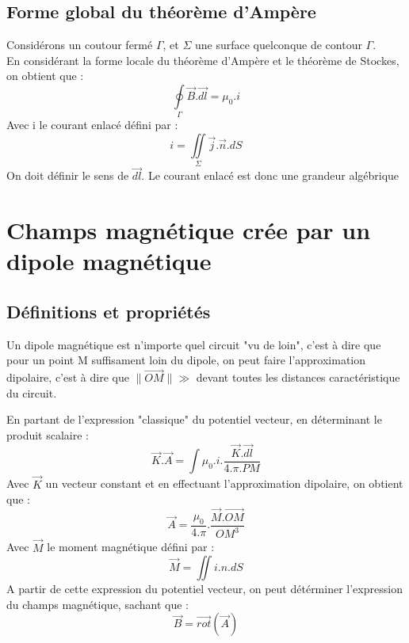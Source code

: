 \section{Forme global du théorème d'Ampère}
\begin{theo}
Considérons un coutour fermé $\Gamma$, et $\Sigma$ une surface quelconque de contour $\Gamma$.\\
En considérant la forme locale du théorème d'Ampère et le théorème de Stockes, on obtient que : 
$$\underset{\Gamma}\oint \overrightarrow{B}.\overrightarrow{dl}= \mu_0.i$$
Avec i le courant enlacé défini par : 
$$i = \underset{\Sigma}\iint \overrightarrow{j}.\overrightarrow{n}.dS$$
On doit définir le sens de $\overrightarrow{dl}$. Le courant enlacé est donc une grandeur algébrique
\end{theo}
\chapter{Champs magnétique crée par un dipole magnétique}
\section{Définitions et propriétés}
\begin{de}
Un dipole magnétique est n'importe quel circuit "vu de loin", c'est à dire que pour un point M suffisament loin du dipole, on peut faire l'approximation dipolaire, c'est à dire que $\parallel\overrightarrow{OM}\parallel \gg$ devant toutes les distances caractéristique du circuit.
\end{de}
\begin{prop}
En partant de l'expression "classique" du potentiel vecteur, en déterminant le produit scalaire :
$$\overrightarrow{K}.\overrightarrow{A} = \int \mu_0.i.\dfrac{\overrightarrow{K}.\overrightarrow{dl}}{4.\pi.PM}$$
Avec $\overrightarrow{K}$ un vecteur constant et en effectuant l'approximation dipolaire, on obtient que : 
$$\overrightarrow{A} = \dfrac{\mu_0}{4.\pi}.\dfrac{\overrightarrow{M}.\overrightarrow{OM}}{OM^3}$$
Avec $\overrightarrow{M}$ le moment magnétique défini par : 
$$\overrightarrow{M} = \iint i.n.dS$$
A partir de cette expression du potentiel vecteur, on peut détérminer l'expression du champs magnétique, sachant que :
$$\overrightarrow{B} = \overrightarrow{rot}(\overrightarrow{A})$$
\end{prop}
